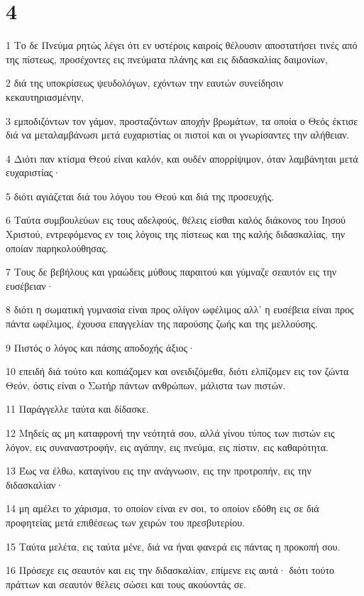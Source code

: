 \chapter{4}

\par 1 Το δε Πνεύμα ρητώς λέγει ότι εν υστέροις καιροίς θέλουσιν αποστατήσει τινές από της πίστεως, προσέχοντες εις πνεύματα πλάνης και εις διδασκαλίας δαιμονίων,
\par 2 διά της υποκρίσεως ψευδολόγων, εχόντων την εαυτών συνείδησιν κεκαυτηριασμένην,
\par 3 εμποδιζόντων τον γάμον, προσταζόντων αποχήν βρωμάτων, τα οποία ο Θεός έκτισε διά να μεταλαμβάνωσι μετά ευχαριστίας οι πιστοί και οι γνωρίσαντες την αλήθειαν.
\par 4 Διότι παν κτίσμα Θεού είναι καλόν, και ουδέν απορρίψιμον, όταν λαμβάνηται μετά ευχαριστίας·
\par 5 διότι αγιάζεται διά του λόγου του Θεού και διά της προσευχής.
\par 6 Ταύτα συμβουλεύων εις τους αδελφούς, θέλεις είσθαι καλός διάκονος του Ιησού Χριστού, εντρεφόμενος εν τοις λόγοις της πίστεως και της καλής διδασκαλίας, την οποίαν παρηκολούθησας.
\par 7 Τους δε βεβήλους και γραώδεις μύθους παραιτού και γύμναζε σεαυτόν εις την ευσέβειαν·
\par 8 διότι η σωματική γυμνασία είναι προς ολίγον ωφέλιμος αλλ' η ευσέβεια είναι προς πάντα ωφέλιμος, έχουσα επαγγελίαν της παρούσης ζωής και της μελλούσης.
\par 9 Πιστός ο λόγος και πάσης αποδοχής άξιος·
\par 10 επειδή διά τούτο και κοπιάζομεν και ονειδιζόμεθα, διότι ελπίζομεν εις τον ζώντα Θεόν, όστις είναι ο Σωτήρ πάντων ανθρώπων, μάλιστα των πιστών.
\par 11 Παράγγελλε ταύτα και δίδασκε.
\par 12 Μηδείς ας μη καταφρονή την νεότητά σου, αλλά γίνου τύπος των πιστών εις λόγον, εις συναναστροφήν, εις αγάπην, εις πνεύμα, εις πίστιν, εις καθαρότητα.
\par 13 Έως να έλθω, καταγίνου εις την ανάγνωσιν, εις την προτροπήν, εις την διδασκαλίαν·
\par 14 μη αμέλει το χάρισμα, το οποίον είναι εν σοι, το οποίον εδόθη εις σε διά προφητείας μετά επιθέσεως των χειρών του πρεσβυτερίου.
\par 15 Ταύτα μελέτα, εις ταύτα μένε, διά να ήναι φανερά εις πάντας η προκοπή σου.
\par 16 Πρόσεχε εις σεαυτόν και εις την διδασκαλίαν, επίμενε εις αυτά· διότι τούτο πράττων και σεαυτόν θέλεις σώσει και τους ακούοντάς σε.

